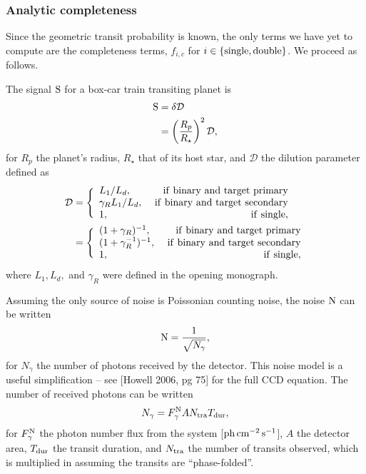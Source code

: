\documentclass{emulateapj}
\begin{document}
\subsubsection{Analytic completeness}
Since the geometric transit probability is known, the only terms we have yet to 
compute are the completeness terms, $f_{i,c}$ for $i\in{\rm \{single,double\} 
}$. We proceed as follows.

The signal ${\rm S}$ for a box-car train transiting planet is
\begin{align}
{\rm S} &= \delta \mathcal{D} \\
&= \left(\frac{R_p}{R_\star}\right)^2 \mathcal{D},
\end{align}
for $R_p$ the planet's radius, $R_\star$ that of its host star, and 
$\mathcal{D}$ the dilution parameter defined as
\begin{align}
  \mathcal{D} &= 
  \Bigg\{\begin{array}{lr}
  L_1 / L_d, & {\rm\ if\ binary\ and\ target\ primary}\\
  \gamma_R L_1 / L_d, & {\rm\ if\ binary\ and\ target\ 
  secondary}\\
  1, & {\rm\ if\ single},
  \end{array} \nonumber\\
  &=
    \Bigg\{\begin{array}{lr}
    (1+\gamma_R)^{-1}, & {\rm\ if\ binary\ and\ target\ primary}\\
    (1 + \gamma_R^{-1})^{-1}, & {\rm\ if\ binary\ and\ target\ 
    	secondary}\\
    1, & {\rm\ if\ single},
    \end{array} 
  \label{eq:dilution}
\end{align}
where $L_1, L_d,$ and $\gamma_R$ were defined in the opening monograph.

Assuming the only source of noise is Poissonian counting noise, the noise ${\rm 
N}$ can be written
\begin{equation}
{\rm N} = \frac{1}{\sqrt{N_\gamma}},
\end{equation}
for $N_\gamma$ the number of photons received by the detector. This noise model 
is a useful simplification -- see [Howell 2006, pg 75] for the full 
CCD equation.
The number of received photons can be written
\begin{equation}
N_\gamma = F^{\rm N}_\gamma A N_{\rm tra} T_{\rm dur},
\end{equation}
for $F^{\rm N}_\gamma$ the photon number flux from the system [${\rm 
ph\,cm^{-2}\,s^{-1}}$], 
$A$ the detector area, $T_{\rm dur}$ the transit duration, and $N_{\rm tra} $ 
the number of transits observed, which is multiplied in assuming the transits 
are ``phase-folded''.
	
\end{document}
